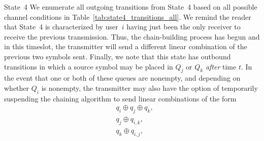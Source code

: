 

\begin{LaTeXdescription}
	\item [State~4]  We enumerate all outgoing transitions from State~4 based on all possible channel conditions in Table~\ref{tab:state4_transitions_all}.  We remind the reader that State~4 is characterized by user~$i$ having just been the only receiver to receive the previous transmission.  Thus, the chain-building process has begun and in this timeslot, the transmitter will send a different linear combination of the previous two symbols sent.
	Finally, we note that this state has outbound transitions in which a source symbol may be placed in $Q_{j}$ or $Q_k$ \emph{after} time $t$.  In the event that one or both of these queues are nonempty, and depending on whether $Q_i$ is nonempty,  the transmitter may also have the option of temporarily suspending the chaining algorithm to send linear combinations of the form 
	\begin{subequations}	
	\label{eq:linear_comb_available}
		\begin{align}
			\label{eq:linear_comb_available_a}
			&q_{i} \oplus q_{j} \oplus q_{k},\\
			\label{eq:linear_comb_available_b}
			&q_j \oplus q_{i, k}, \\%
			\label{eq:linear_comb_available_c}
			&q_{k} \oplus q_{i, j}, %
		\end{align}


\end{subequations}
\end{LaTeXdescription}
